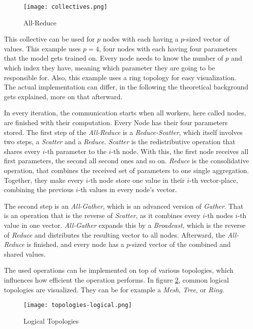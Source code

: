 \begin{figure}[h]  %
  \centering
  \texttt{[image: collectives.png]}
  \caption{All-Reduce}
  \label{fig:collectives}
\end{figure}

This collective can be used for $p$ nodes with each having a  $p$-sized vector of values. 
This example uses $p = 4$, four nodes with each having four parameters that the model gets trained on. 
Every node needs to know the number of $p$ and which index they have, meaning which parameter they are going to be responsible for. Also, this example uses a ring topology for easy visualization. The actual implementation can differ, in the following the theoretical background gets explained, more on that afterward.

In every iteration, the communication starts when all workers, here called nodes, are finished with their computation. Every Node has their four parameters stored.
The first step of the \textit{All-Reduce} is a \textit{Reduce-Scatter}, which itself involves two steps, a \textit{Scatter} and a \textit{Reduce}. \textit{Scatter} is the redistributive operation that shares every $i$-th parameter to the $i$-th node. With this, the first node receives all first parameters, the second all second ones and so on. 
\textit{Reduce} is the consolidative operation, that combines the received set of parameters to one single aggregation.
Together, they make every $i$-th node store one value in their $i$-th vector-place, combining the previous $i$-th values in every node's vector.

The second step is an \textit{All-Gather}, which is an advanced version of \textit{Gather}. That is an operation that is the reverse of \textit{Scatter}, as it combines every $i$-th nodes $i$-th value in one vector. \textit{All-Gather} expands this by a \textit{Broadcast}, which is the reverse of \textit{Reduce} and distributes the resulting vector to all nodes.
Afterward, the \textit{All-Reduce} is finished, and every node has a $p$-sized vector of the combined and shared values.

The used operations can be implemented  on top of various topologies, which influences how efficient the operation performs. In figure \ref{fig:topologies-logical}, common logical topologies are visualized. They can be for example a \textit{Mesh}, \textit{Tree}, or \textit{Ring}.

\begin{figure}[H]  %
  \centering
  \texttt{[image: topologies-logical.png]}
  \caption{Logical Topologies}
  \label{fig:topologies-logical}
\end{figure}

